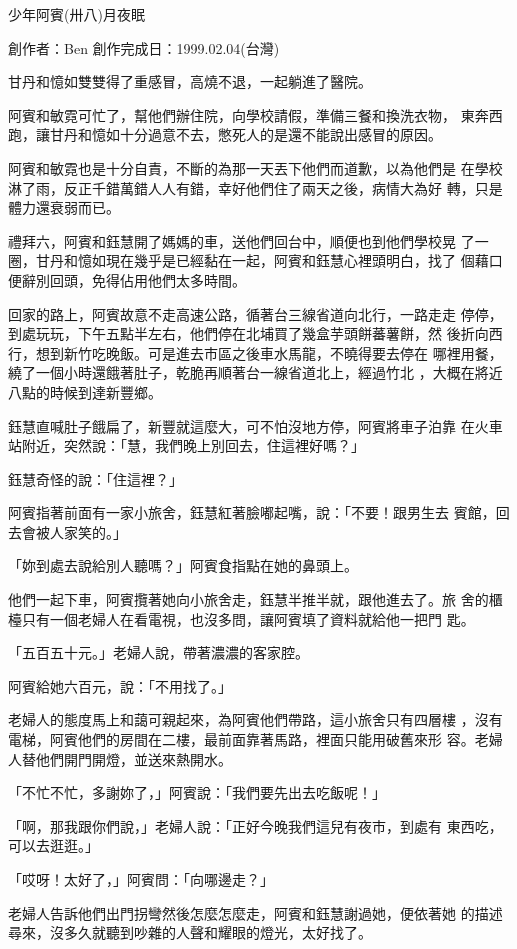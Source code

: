 



少年阿賓(卅八)月夜眠

創作者：Ben
創作完成日：1999.02.04(台灣)


甘丹和憶如雙雙得了重感冒，高燒不退，一起躺進了醫院。

阿賓和敏霓可忙了，幫他們辦住院，向學校請假，準備三餐和換洗衣物，
東奔西跑，讓甘丹和憶如十分過意不去，憋死人的是還不能說出感冒的原因。

阿賓和敏霓也是十分自責，不斷的為那一天丟下他們而道歉，以為他們是
在學校淋了雨，反正千錯萬錯人人有錯，幸好他們住了兩天之後，病情大為好
轉，只是體力還衰弱而已。

禮拜六，阿賓和鈺慧開了媽媽的車，送他們回台中，順便也到他們學校晃
了一圈，甘丹和憶如現在幾乎是已經黏在一起，阿賓和鈺慧心裡頭明白，找了
個藉口便辭別回頭，免得佔用他們太多時間。

回家的路上，阿賓故意不走高速公路，循著台三線省道向北行，一路走走
停停，到處玩玩，下午五點半左右，他們停在北埔買了幾盒芋頭餅蕃薯餅，然
後折向西行，想到新竹吃晚飯。可是進去市區之後車水馬龍，不曉得要去停在
哪裡用餐，繞了一個小時還餓著肚子，乾脆再順著台一線省道北上，經過竹北
，大概在將近八點的時候到達新豐鄉。

鈺慧直喊肚子餓扁了，新豐就這麼大，可不怕沒地方停，阿賓將車子泊靠
在火車站附近，突然說：「慧，我們晚上別回去，住這裡好嗎？」

鈺慧奇怪的說：「住這裡？」

阿賓指著前面有一家小旅舍，鈺慧紅著臉嘟起嘴，說：「不要！跟男生去
賓館，回去會被人家笑的。」

「妳到處去說給別人聽嗎？」阿賓食指點在她的鼻頭上。

他們一起下車，阿賓攬著她向小旅舍走，鈺慧半推半就，跟他進去了。旅
舍的櫃檯只有一個老婦人在看電視，也沒多問，讓阿賓填了資料就給他一把門
匙。

「五百五十元。」老婦人說，帶著濃濃的客家腔。

阿賓給她六百元，說：「不用找了。」

老婦人的態度馬上和藹可親起來，為阿賓他們帶路，這小旅舍只有四層樓
，沒有電梯，阿賓他們的房間在二樓，最前面靠著馬路，裡面只能用破舊來形
容。老婦人替他們開門開燈，並送來熱開水。

「不忙不忙，多謝妳了，」阿賓說：「我們要先出去吃飯呢！」

「啊，那我跟你們說，」老婦人說：「正好今晚我們這兒有夜市，到處有
東西吃，可以去逛逛。」

「哎呀！太好了，」阿賓問：「向哪邊走？」

老婦人告訴他們出門拐彎然後怎麼怎麼走，阿賓和鈺慧謝過她，便依著她
的描述尋來，沒多久就聽到吵雜的人聲和耀眼的燈光，太好找了。

